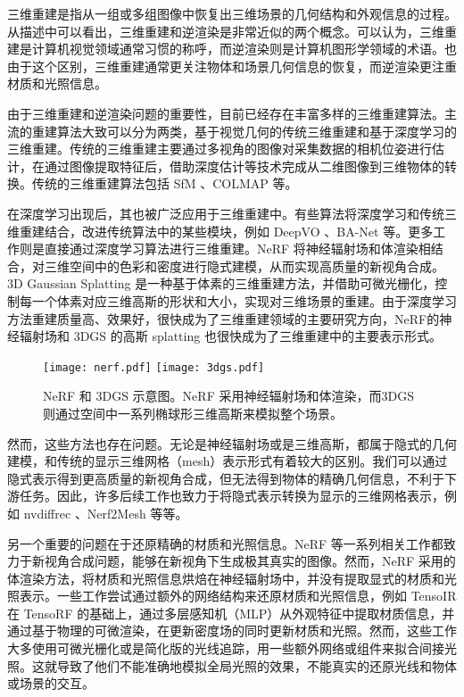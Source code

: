 三维重建是指从一组或多组图像中恢复出三维场景的几何结构和外观信息的过程。从描述中可以看出，三维重建和逆渲染是非常近似的两个概念。可以认为，三维重建是计算机视觉领域通常习惯的称呼，而逆渲染则是计算机图形学领域的术语。也由于这个区别，三维重建通常更关注物体和场景几何信息的恢复，而逆渲染更注重材质和光照信息。

由于三维重建和逆渲染问题的重要性，目前已经存在丰富多样的三维重建算法。主流的重建算法大致可以分为两类，基于视觉几何的传统三维重建和基于深度学习的三维重建。传统的三维重建主要通过多视角的图像对采集数据的相机位姿进行估计，在通过图像提取特征后，借助深度估计等技术完成从二维图像到三维物体的转换。传统的三维重建算法包括 SfM \cite{SfM}、COLMAP \cite{COLMAP1,COLMAP2} 等。

在深度学习出现后，其也被广泛应用于三维重建中。有些算法将深度学习和传统三维重建结合，改进传统算法中的某些模块，例如 DeepVO \cite{DeepVO}、BA-Net \cite{BA-Net} 等。更多工作则是直接通过深度学习算法进行三维重建。NeRF \cite{nerf} 将神经辐射场和体渲染相结合，对三维空间中的色彩和密度进行隐式建模，从而实现高质量的新视角合成。3D Gaussian Splatting \cite{3DGS} 是一种基于体素的三维重建方法，并借助可微光栅化，控制每一个体素对应三维高斯的形状和大小，实现对三维场景的重建。由于深度学习方法重建质量高、效果好，很快成为了三维重建领域的主要研究方向，NeRF的神经辐射场和 3DGS 的高斯 splatting 也很快成为了三维重建中的主要表示形式。

\begin{figure}[htbp]
  \centering
  \texttt{[image: nerf.pdf]}
  \hspace{\fill}
  \texttt{[image: 3dgs.pdf]}
  \caption{NeRF 和 3DGS 示意图。NeRF 采用神经辐射场和体渲染，而3DGS则通过空间中一系列椭球形三维高斯来模拟整个场景。}
  \label{fig:nerf-3dgs}
\end{figure}

然而，这些方法也存在问题。无论是神经辐射场或是三维高斯，都属于隐式的几何建模，和传统的显示三维网格（mesh）表示形式有着较大的区别。我们可以通过隐式表示得到更高质量的新视角合成，但无法得到物体的精确几何信息，不利于下游任务。因此，许多后续工作也致力于将隐式表示转换为显示的三维网格表示，例如 nvdiffrec \cite{nvdiffrec}、Nerf2Mesh \cite{Nerf2Mesh} 等等。

另一个重要的问题在于还原精确的材质和光照信息。NeRF 等一系列相关工作都致力于新视角合成问题，能够在新视角下生成极其真实的图像。然而，NeRF 采用的体渲染方法，将材质和光照信息烘焙在神经辐射场中，并没有提取显式的材质和光照表示。一些工作尝试通过额外的网络结构来还原材质和光照信息，例如 TensoIR \cite{tensoir} 在 TensoRF \cite{tensorf} 的基础上，通过多层感知机（MLP）从外观特征中提取材质信息，并通过基于物理的可微渲染，在更新密度场的同时更新材质和光照。然而，这些工作大多使用可微光栅化或是简化版的光线追踪，用一些额外网络或组件来拟合间接光照。这就导致了他们不能准确地模拟全局光照的效果，不能真实的还原光线和物体或场景的交互。

